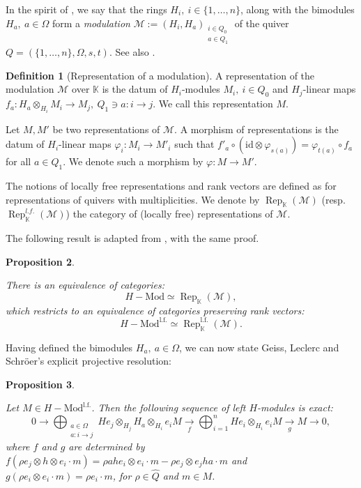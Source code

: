 \documentclass[11pt,english]{article}
\numberwithin{equation}{section}
\numberwithin{figure}{section}
\theoremstyle{definition}
\newtheorem{df}{Definition}[subsection]
\theoremstyle{plain}
\newtheorem{prop}[df]{Proposition}
\theoremstyle{remark}
\DeclareMathOperator{\Rep}{Rep}
\newcommand\KK{\mathbb{K}}
\begin{document}
In the spirit of \cite[\S 5.2.]{GLS17a}, we say that the rings $H_{i},\ i\in\{1,\ldots,n\}$,
along with the bimodules $H_{a},\ a\in\Omega$ form a \textit{modulation}
$\mathcal{M}:=(H_{i},H_{a})_{\substack{i\in Q_{0}\\
a\in Q_{1}
}
}$ of the quiver $Q=(\{1,\ldots,n\},\Omega,s,t)$. See also \cite{Li12}.

\begin{df}[Representation of a modulation]

A representation of the modulation $\mathcal{M}$ over $\KK$ is the
datum of $H_{i}$-modules $M_{i},\ i\in Q_{0}$ and $H_{j}$-linear
maps $f_{a}:H_{a}\otimes_{H_{i}}M_{i}\rightarrow M_{j},\ Q_{1}\ni a:i\rightarrow j$.
We call this representation $M$.

Let $M,M'$ be two representations of $\mathcal{M}$. A morphism of
representations is the datum of $H_{i}$-linear maps $\varphi_{i}:M_{i}\rightarrow M'_{i}$
such that $f'_{a}\circ(\mathrm{id}\otimes\varphi_{s(a)})=\varphi_{t(a)}\circ f_{a}$
for all $a\in Q_{1}$. We denote such a morphism by $\varphi:M\rightarrow M'$.

The notions of locally free representations and rank vectors are defined
as for representations of quivers with multiplicities. We denote by
$\Rep_{\KK}(\mathcal{M})$ (resp. $\Rep_{\KK}^{l.f.}(\mathcal{M})$)
the category of (locally free) representations of $\mathcal{M}$.

\end{df}

The following result is adapted from \cite[Prop. 5.1.]{GLS17a}, with
the same proof.

\begin{prop}{\cite[Prop. 5.1.]{GLS17a}}

There is an equivalence of categories:\[
H-\mathrm{Mod}\simeq\Rep_{\KK}(\mathcal{M}),
\]which restricts to an equivalence of categories preserving rank vectors:\[
H-\mathrm{Mod}^{\mathrm{l.f.}}\simeq\Rep_{\KK}^{\mathrm{l.f.}}(\mathcal{M}).
\]

\end{prop}

Having defined the bimodules $H_{a},\ a\in\Omega$, we can now state
Geiss, Leclerc and Schröer's explicit projective resolution:

\begin{prop}{\cite[Cor. 7.2.]{GLS17a}} \label{Prop/ProjResH}

Let $M\in H-\mathrm{Mod}^{\mathrm{l.f.}}$. Then the following sequence
of left $H$-modules is exact:\[
0\rightarrow\bigoplus_{\substack{a\in\Omega \\ a:i\rightarrow j}}He_j\otimes_{H_j}H_a\otimes_{H_i}e_iM
\underset{f}{\rightarrow}\bigoplus_{i=1}^nHe_i\otimes_{H_i}e_iM
\underset{g}{\rightarrow} M\rightarrow 0,
\] where $f$ and $g$ are determined by $f(\rho e_{j}\otimes h\otimes e_{i}\cdot m)=\rho ahe_{i}\otimes e_{i}\cdot m-\rho e_{j}\otimes e_{j}ha\cdot m$
and $g(\rho e_{i}\otimes e_{i}\cdot m)=\rho e_{i}\cdot m$, for $\rho\in\hat{Q}$
and $m\in M$.

\end{prop}
\end{document}
